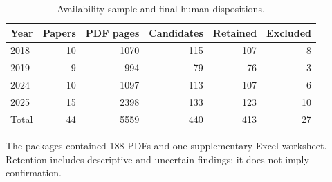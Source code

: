 \begin{table}[tbp]
\centering\small
\caption{Availability sample and final human dispositions.}
\label{tab:cohort}
\begin{tabular}{lrrrrr}
\toprule
Year & Papers & PDF pages & Candidates & Retained & Excluded \\
\midrule
2018 & 10 & 1070 & 115 & 107 & 8 \\
2019 & 9 & 994 & 79 & 76 & 3 \\
2024 & 10 & 1097 & 113 & 107 & 6 \\
2025 & 15 & 2398 & 133 & 123 & 10 \\
\midrule
Total & 44 & 5559 & 440 & 413 & 27 \\
\bottomrule
\end{tabular}
\par\smallskip\begin{minipage}{0.97\linewidth}\footnotesize The packages contained 188 PDFs and one supplementary Excel worksheet. Retention includes descriptive and uncertain findings; it does not imply confirmation.\end{minipage}
\end{table}
